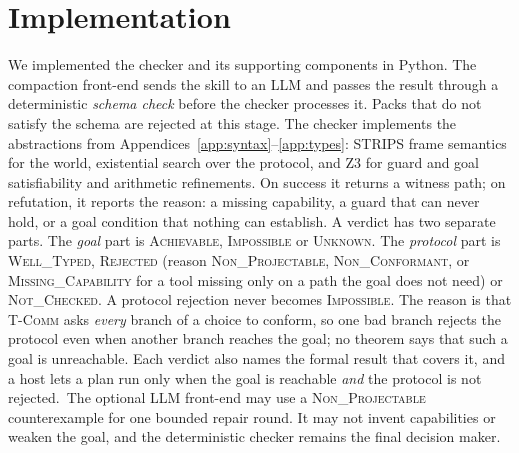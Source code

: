 \documentclass{article}
\theoremstyle{plain}
\theoremstyle{definition}
\newcommand{\bnew}{\begingroup\color{revblue}}
\newcommand{\bnew}{\begingroup}
\newcommand{\enew}{\endgroup}
\newcommand{\new}[1]{{\bnew #1\enew}}
\begin{document}
\section{Implementation}\label{sec:implementation}

We implemented the checker and its supporting components in Python. The
compaction front-end sends the skill to an LLM and passes the result through a
deterministic \emph{schema check} before the checker processes it.
Packs that do not satisfy the schema are rejected at this stage.
The checker implements the abstractions from
Appendices~\ref{app:syntax}--\ref{app:types}: STRIPS frame semantics for the
world, existential search over the protocol, and Z3 for guard and goal
satisfiability and arithmetic refinements. On success it returns a witness
path; on refutation, it reports the reason\new{: a missing capability, a guard
that can never hold, or a goal condition that nothing can establish}.
\bnew A verdict has two separate parts. The \emph{goal} part is
\textsc{Achievable}, \textsc{Impossible} or \textsc{Unknown}. The
\emph{protocol} part is \textsc{Well\_Typed}, \textsc{Rejected} (reason
\textsc{Non\_Projectable}, \textsc{Non\_Conformant}, or
\textsc{Missing\_Capability} for a tool missing only on a path the goal does
not need) or \textsc{Not\_Checked}.
A protocol rejection never becomes \textsc{Impossible}. The reason is that
\textsc{T-Comm} asks \emph{every} branch of a choice to conform, so one bad
branch rejects the protocol even when another branch reaches the goal; no
theorem says that such a goal is unreachable. Each verdict also names the
formal result that covers it, and a host lets a plan run only when the goal is
reachable \emph{and} the protocol is not rejected.\enew\
The optional LLM front-end may use a \textsc{Non\_Projectable} counterexample
for one bounded repair round. It may not invent capabilities or weaken the
goal, and the deterministic checker remains the final decision maker.
\end{document}
